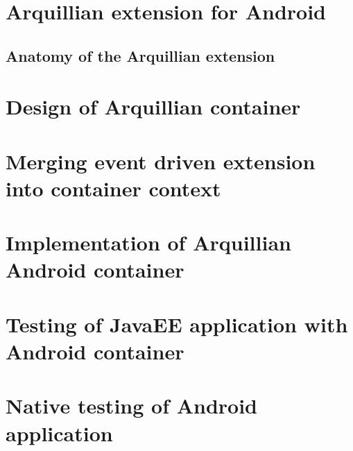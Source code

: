 \documentclass[12pt,final,oneside]{fithesis}
\begin{document}
\chapter{Arquillian extension for Android}
	\section{Anatomy of the Arquillian extension}
	
\chapter{Design of Arquillian container}
	\chapter{Merging event driven extension into container context}
	
\chapter{Implementation of Arquillian Android container}

\chapter{Testing of JavaEE application with Android container}

\chapter{Native testing of Android application}


\end{document}
